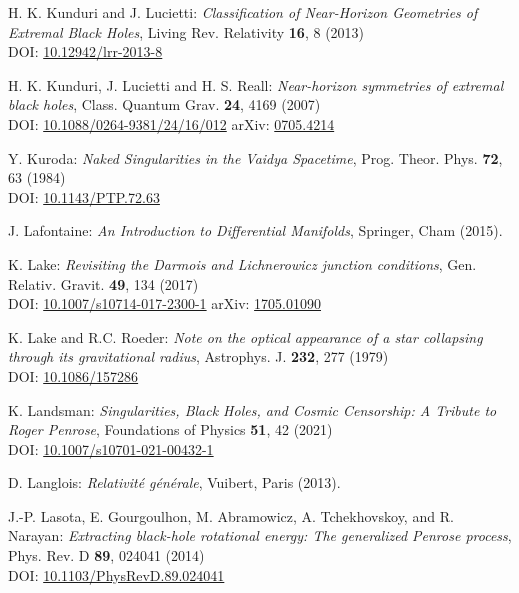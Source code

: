 \begin{thebibliography}{123}
H. K. Kunduri and J. Lucietti:
{\em Classification of Near-Horizon Geometries of Extremal Black Holes},
Living Rev. Relativity {\bf 16}, 8 (2013)\\
DOI: \href{https://doi.org/10.12942/lrr-2013-8}{10.12942/lrr-2013-8}

H. K. Kunduri, J. Lucietti and H. S. Reall:
{\em Near-horizon symmetries of extremal black holes},
Class. Quantum Grav. {\bf 24}, 4169 (2007)\\
DOI: \href{https://doi.org/10.1088/0264-9381/24/16/012}{10.1088/0264-9381/24/16/012}\hfill
arXiv: \href{https://arxiv.org/abs/0705.4214}{0705.4214}

Y. Kuroda:
{\em Naked Singularities in the Vaidya Spacetime},
Prog. Theor. Phys. {\bf 72}, 63 (1984)\\
DOI: \href{https://doi.org/10.1143/PTP.72.63}{10.1143/PTP.72.63}

J. Lafontaine: {\em An Introduction to Differential Manifolds},
Springer, Cham (2015).

K. Lake:
{\em Revisiting the Darmois and Lichnerowicz junction conditions},
Gen. Relativ. Gravit. {\bf 49}, 134 (2017)\\
DOI: \href{https://doi.org/10.1007/s10714-017-2300-1}{10.1007/s10714-017-2300-1}\hfill
arXiv: \href{https://arxiv.org/abs/1705.01090}{1705.01090}

K. Lake and R.C. Roeder:
{\em Note on the optical appearance of a star collapsing through its gravitational radius},
Astrophys. J. {\bf 232}, 277 (1979)\\
DOI: \href{https://doi.org/10.1086/157286}{10.1086/157286}

K. Landsman:
{\em Singularities, Black Holes, and Cosmic Censorship:
A Tribute to Roger Penrose},
Foundations of Physics {\bf 51}, 42 (2021)\\
DOI: \href{https://doi.org/10.1007/s10701-021-00432-1}{10.1007/s10701-021-00432-1}

D. Langlois: \emph{Relativit\'e g\'en\'erale},
Vuibert, Paris (2013).

J.-P. Lasota, E. Gourgoulhon, M. Abramowicz, A. Tchekhovskoy,
and R. Narayan:
{\em Extracting black-hole rotational energy: The generalized Penrose process},
Phys. Rev. D {\bf 89}, 024041 (2014)  \\
DOI: \href{https://doi.org/10.1103/PhysRevD.89.024041}{10.1103/PhysRevD.89.024041}


\end{thebibliography}
